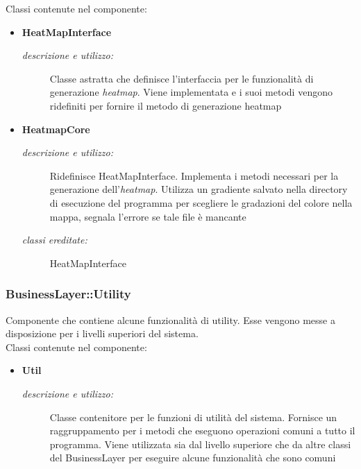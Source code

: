 Classi contenute nel componente: 
\begin{itemize} 
\item \textbf{HeatMapInterface}
\begin{description}
\item [\textit{descrizione e utilizzo:}] Classe astratta che definisce l'interfaccia per le funzionalità di generazione \textit{heatmap}. Viene implementata e i suoi metodi vengono ridefiniti per fornire il metodo di generazione heatmap
\end{description}
\item \textbf{HeatmapCore}
\begin{description}
\item [\textit{descrizione e utilizzo:}] Ridefinisce HeatMapInterface. Implementa i metodi necessari per la generazione dell'\textit{heatmap}. Utilizza un gradiente salvato nella directory di esecuzione del programma per scegliere le gradazioni del colore nella mappa, segnala l'errore se tale file è mancante
\item [\textit{classi ereditate:}] HeatMapInterface
\end{description}
\end{itemize}

\subsubsection{BusinessLayer::Utility} \label{sec:c2.4}
Componente che contiene alcune funzionalità di utility. Esse vengono messe a disposizione per i livelli superiori del sistema.\\
Classi contenute nel componente: 
\begin{itemize} 
\item \textbf{Util}
\begin{description}
\item [\textit{descrizione e utilizzo:}] Classe contenitore per le funzioni di utilità del sistema. Fornisce un raggruppamento per i metodi che eseguono operazioni comuni a tutto il programma. Viene utilizzata sia dal livello superiore che da altre classi del BusinessLayer per eseguire alcune funzionalità che sono comuni
\end{description}
\end{itemize}

